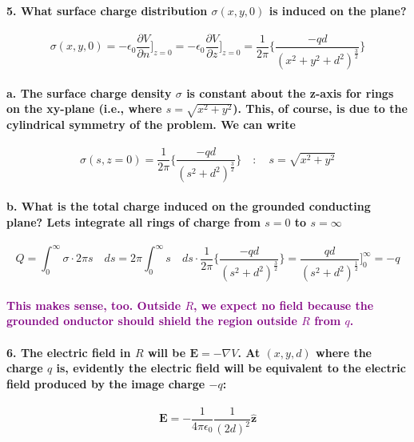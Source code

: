 \documentclass{article}
\begin{document}
\paragraph{5. What surface charge distribution $\sigma(x,y,0)$ is induced on the plane?}
\begin{equation*}
    \sigma(x,y,0)=-\epsilon_0\frac{\partial V}{\partial n}\bigg]_{z=0}=-\epsilon_0\frac{\partial V}{\partial z}\bigg]_{z=0}=\frac{1}{2\pi}\bigg\{ \frac{-qd}{(x^2+y^2+d^2)^\frac{3}{2}}\bigg\}
\end{equation*}
\paragraph{\indent a. The surface charge density $\sigma$ is constant about the z-axis for rings on the xy-plane (i.e., where $s=\sqrt{x^2+y^2}$). This, of course, is due to the cylindrical symmetry of the problem. We can write}
\begin{equation*}
    \sigma(s,z=0)=\frac{1}{2\pi}\bigg\{ \frac{-qd}{(s^2+d^2)^{\frac{3}{2}}} \bigg\} \quad:\quad s=\sqrt{x^2+y^2}
\end{equation*}
\paragraph{\indent b. What is the total charge induced on the grounded conducting plane? Lets integrate all rings of charge from $s=0$ to $s=\infty$}
\begin{equation*}
    Q=\int_0^{\infty}\sigma\cdot 2\pi s\quad ds=2\pi\int_0^{\infty}s\quad ds\cdot \frac{1}{2\pi}\bigg\{ \frac{-qd}{(s^2+d^2)^{\frac{3}{2}}}\bigg\} =\frac{qd}{(s^2+d^2)^{\frac{1}{2}}}\bigg]_0^{\infty}=-q
\end{equation*}
\paragraph{\textcolor{purple}{This makes sense, too. Outside $R$, we expect no field because the grounded onductor should shield the region outside $R$ from $q$.}}
\paragraph{6. The electric field in $R$ will be $\boldsymbol{E}=-\nabla V$. At $(x,y,d)$ where the charge $q$ is, evidently the electric field will be equivalent to the electric field produced by the image charge $-q$:}
\begin{equation*}
    \boldsymbol{E}=-\frac{1}{4\pi \epsilon_0}\frac{1}{(2d)^2}\hat{\boldsymbol{z}}
\end{equation*}
\end{document}
